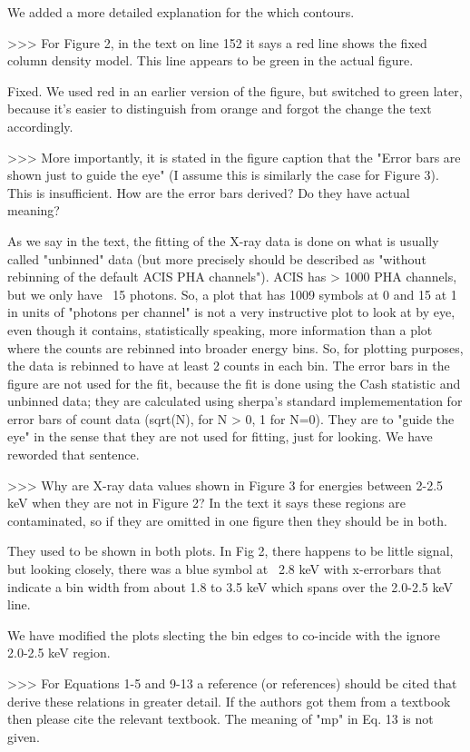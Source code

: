 We added a more detailed explanation for the which contours.

>>> For Figure 2, in the text on line 152 it says a red line shows the fixed column density model. This line appears to be green in the actual figure.

Fixed. We used red in an earlier version of the figure, but switched to green later, because it's easier to distinguish from orange and forgot the change the text accordingly.

>>> More importantly, it is stated in the figure caption that the "Error bars are shown just to guide the eye" (I assume this is similarly the case for Figure 3). This is insufficient. How are the error bars derived? Do they have actual meaning? 

As we say in the text, the fitting of the X-ray data is done on what is usually called "unbinned" data (but more precisely should be described as "without rebinning of the default ACIS PHA channels"). ACIS has > 1000 PHA channels, but we only have ~15 photons. So, a plot that has 1009 symbols at 0 and 15 at 1 in units of "photons per channel" is not a very instructive plot to look at by eye, even though it contains, statistically speaking, more information than a plot where the counts are rebinned into broader energy bins. So, for plotting purposes, the data is rebinned to have at least 2 counts in each bin. The error bars in the figure are not used for the fit, because the fit is done using the Cash statistic and unbinned data; they are calculated using sherpa's standard implemementation for error bars of count data (sqrt(N), for N > 0, 1 for N=0). They are to "guide the eye" in the sense that they are not used for fitting, just for looking. We have reworded that sentence.

>>> Why are X-ray data values shown in Figure 3 for energies between 2-2.5 keV when they are not in Figure 2? In the text it says these regions are contaminated, so if they are omitted in one figure then they should be in both.

They used to be shown in both plots. In Fig 2, there happens to be little signal, but looking closely, there was a blue symbol at ~2.8 keV with x-errorbars that indicate a bin width from about 1.8 to 3.5 keV which spans over the 2.0-2.5 keV line. 

We have modified the plots slecting the bin edges to co-incide with the ignore 2.0-2.5 keV region. 

 

>>> For Equations 1-5 and 9-13 a reference (or references) should be cited that derive these relations in greater detail. If the authors got them from a textbook then please cite the relevant textbook. The meaning of "mp" in Eq. 13 is not given.

